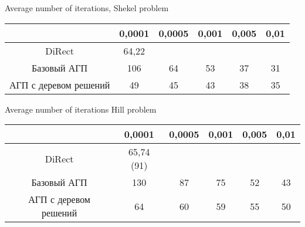 \documentclass[entropy,article,submit,moreauthors,pdftex]{Definitions/mdpi}
\begin{document}
\begin{specialtable}[H] 
	\caption{Average number of iterations, Shekel problem}\label{table:average_Shekel}
	\center
\begin{tabular}{cccccc}
\toprule
                                                    & \textbf{0,0001} & \textbf{0,0005} & \textbf{0,001} & \textbf{0,005} & \textbf{0,01} \\
\midrule													
DiRect                                              & 64,22                                   &                                         &                                        &                                        &                                       \\
Базовый АГП                                         & 106                                     & 64                                      & 53                                     & 37                                     & 31                                    \\
АГП с деревом решений & 49                                      & 45                                      & 43                                     & 38                                     & 35                                   \\

\bottomrule
\end{tabular}
\end{specialtable}

\begin{specialtable}[H] 
	\caption{Average number of iterations Hill problem}\label{table:average_Hill}
	\center
\begin{tabular}{cccccc}
\toprule
                      & \textbf{0,0001} & \textbf{0,0005} & \textbf{0,001} & \textbf{0,005} & \textbf{0,01} \\
\midrule					  
DiRect                & 65,74 (91)                              &                                         &                                        &                                        &                                       \\
Базовый АГП           & 130                                     & 87                                      & 75                                     & 52                                     & 43                                    \\
АГП с деревом решений & 64                                      & 60                                      & 59                                     & 55                                     & 50                                    \\
\bottomrule
\end{tabular}
\end{specialtable}
\end{document}
